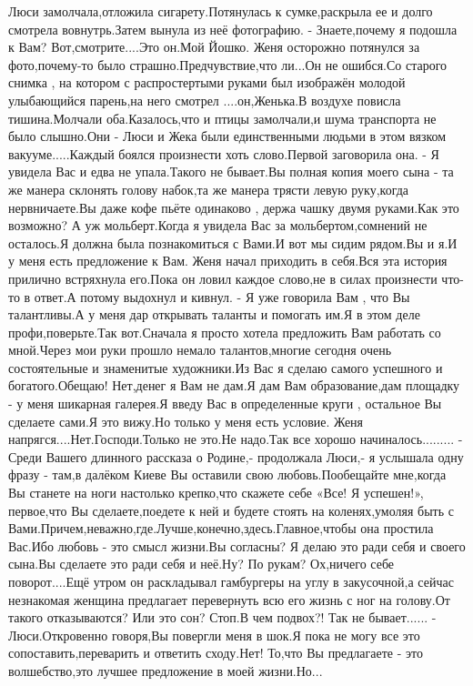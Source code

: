 Люси замолчала,отложила сигарету.Потянулась к сумке,раскрыла ее и долго смотрела вовнутрь.Затем вынула из неё фотографию.
- Знаете,почему я подошла к Вам? Вот,смотрите....Это он.Мой Йошко.
Женя осторожно потянулся за фото,почему-то было страшно.Предчувствие,что ли...Он не ошибся.Со старого снимка , на котором с распростертыми руками был изображён молодой улыбающийся парень,на него смотрел ....он,Женька.В воздухе повисла тишина.Молчали оба.Казалось,что и птицы замолчали,и шума транспорта не было слышно.Они - Люси и Жека были единственными людьми в этом вязком вакууме.....Каждый боялся произнести хоть слово.Первой заговорила она.
- Я увидела Вас и едва не упала.Такого не бывает.Вы полная копия моего сына - та же манера склонять голову набок,та же манера трясти левую руку,когда нервничаете.Вы даже кофе пьёте одинаково , держа чашку двумя руками.Как это возможно? А уж мольберт.Когда я увидела Вас за мольбертом,сомнений не осталось.Я должна была познакомиться с Вами.И вот мы сидим рядом.Вы и я.И у меня есть предложение к Вам.
Женя начал приходить в себя.Вся эта история прилично встряхнула его.Пока он ловил каждое слово,не в силах произнести что-то в ответ.А потому выдохнул и 
кивнул.
- Я уже говорила Вам , что Вы талантливы.А у меня дар открывать таланты и помогать им.Я в этом деле профи,поверьте.Так вот.Сначала я просто хотела предложить Вам работать со мной.Через мои руки прошло немало талантов,многие сегодня очень состоятельные и знаменитые художники.Из Вас я сделаю самого успешного и богатого.Обещаю! Нет,денег я  Вам не дам.Я дам Вам образование,дам площадку - у меня шикарная галерея.Я введу Вас в определенные круги , остальное Вы сделаете сами.Я это вижу.Но только у меня есть условие.
Женя напрягся....Нет.Господи.Только не это.Не надо.Так все хорошо начиналось.........
- Среди Вашего длинного рассказа о Родине,- продолжала Люси,- я услышала одну фразу - там,в далёком Киеве Вы оставили свою любовь.Пообещайте мне,когда Вы станете на ноги настолько крепко,что скажете себе «Все! Я успешен!», первое,что Вы сделаете,поедете к ней и будете стоять на коленях,умоляя быть с Вами.Причем,неважно,где.Лучше,конечно,здесь.Главное,чтобы она простила Вас.Ибо любовь - это смысл жизни.Вы согласны? Я делаю это ради себя  и своего сына.Вы сделаете это ради себя и неё.Ну? По рукам? 
Ох,ничего себе поворот....Ещё утром он раскладывал гамбургеры на углу в закусочной,а сейчас незнакомая  женщина предлагает перевернуть всю его жизнь с ног на голову.От такого отказываются? Или это сон? Стоп.В чем подвох?! Так не бывает......
- Люси.Откровенно говоря,Вы повергли меня в шок.Я пока не могу все это сопоставить,переварить и ответить сходу.Нет! То,что Вы предлагаете - это волшебство,это лучшее предложение в моей жизни.Но...
